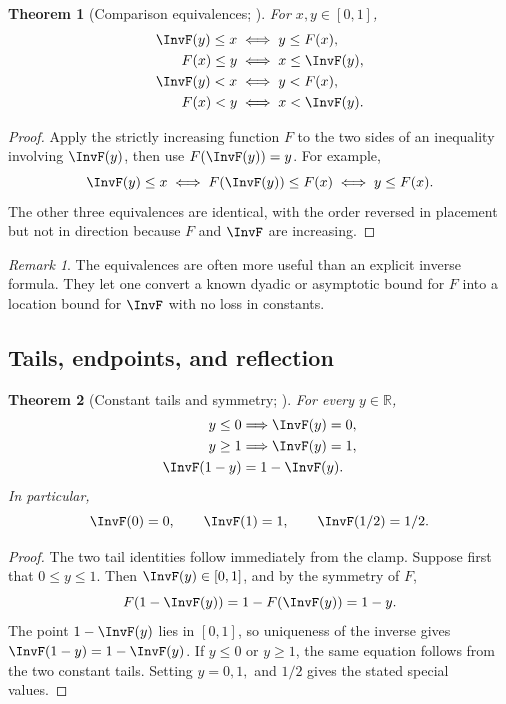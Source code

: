 \documentclass[11pt,oneside]{article}
\newtheorem{theorem}{Theorem}[section]
\theoremstyle{definition}
\theoremstyle{remark}
\newtheorem{remark}[remark]{Remark}
\newcommand{\R}{\mathbb R}
\begin{document}
\begin{theorem}[Comparison equivalences; \Formalized]
\label{inverse:thm:inverse-comparisons}
For $x,y\in[0,1]$,
\begin{align}
 \InvF(y)\leq x&\iff y\leq F(x), \label{inverse:eq:inv-le}\\
 F(x)\leq y&\iff x\leq \InvF(y), \label{inverse:eq:F-le}\\
 \InvF(y)<x&\iff y<F(x), \label{inverse:eq:inv-lt}\\
 F(x)<y&\iff x<\InvF(y). \label{inverse:eq:F-lt}
\end{align}
\end{theorem}

\begin{proof}
Apply the strictly increasing function $F$ to the two sides of an
inequality involving $\InvF(y)$, then use $F(\InvF(y))=y$.  For example,
\[
 \InvF(y)\leq x
 \iff F(\InvF(y))\leq F(x)
 \iff y\leq F(x).
\]
The other three equivalences are identical, with the order reversed in
placement but not in direction because $F$ and $\InvF$ are increasing.
\end{proof}

\begin{remark}
The equivalences are often more useful than an explicit inverse formula.
They let one convert a known dyadic or asymptotic bound for $F$ into a
location bound for $\InvF$ with no loss in constants.
\end{remark}

\subsection{Tails, endpoints, and reflection}

\begin{theorem}[Constant tails and symmetry; \Formalized]
\label{inverse:thm:inverse-symmetry}
For every $y\in\R$,
\begin{align}
 y\leq0&\Longrightarrow \InvF(y)=0,\\
 y\geq1&\Longrightarrow \InvF(y)=1,\\
 \InvF(1-y)&=1-\InvF(y). \label{inverse:eq:inv-reflection}
\end{align}
In particular,
\[
 \InvF(0)=0,\qquad \InvF(1)=1,\qquad \InvF(1/2)=1/2.
\]
\end{theorem}

\begin{proof}
The two tail identities follow immediately from the clamp.  Suppose first
that $0\leq y\leq1$.  Then $\InvF(y)\in[0,1]$, and by the symmetry of $F$,
\[
 F(1-\InvF(y))
   =1-F(\InvF(y))
   =1-y.
\]
The point $1-\InvF(y)$ lies in $[0,1]$, so uniqueness of the inverse gives
$\InvF(1-y)=1-\InvF(y)$.  If $y\leq0$ or $y\geq1$, the same equation follows
from the two constant tails.  Setting $y=0,1,$ and $1/2$ gives the stated
special values.
\end{proof}
\end{document}
